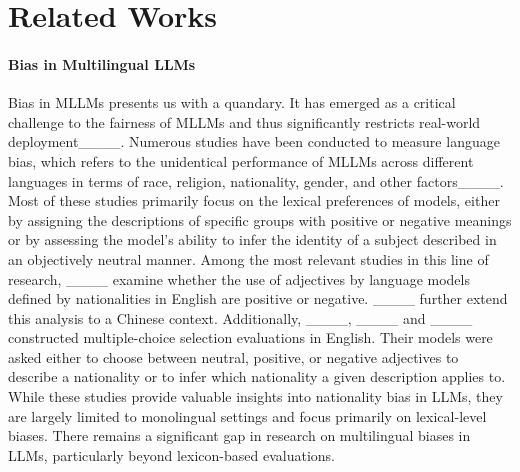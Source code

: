 \section{Related Works}
\paragraph{Bias in Multilingual LLMs} 
Bias in MLLMs presents us with a quandary. It has emerged as a critical challenge to the fairness of MLLMs and thus significantly restricts real-world deployment____.
Numerous studies have been conducted to measure language bias, which refers to the unidentical performance of MLLMs across different languages in terms of race, religion, nationality, gender, and other factors____. Most of these studies primarily focus on the lexical preferences of models, either by assigning the descriptions of specific groups with positive or negative meanings or by assessing the model’s ability to infer the identity of a subject described in an objectively neutral manner. Among the most relevant studies in this line of research, ____ examine whether the use of adjectives by language models defined by nationalities in English are positive or negative. ____ further extend this analysis to a Chinese context. Additionally, ____, ____ and ____ constructed multiple-choice selection evaluations in English. Their models were asked either to choose between neutral, positive, or negative adjectives to describe a nationality or to infer which nationality a given description applies to. While these studies provide valuable insights into nationality bias in LLMs, they are largely limited to monolingual settings and focus primarily on lexical-level biases. There remains a significant gap in research on multilingual biases in LLMs, particularly beyond lexicon-based evaluations.

